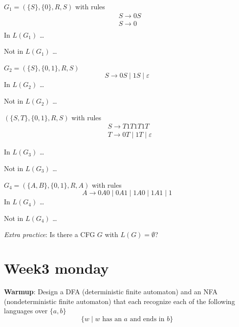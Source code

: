 \documentclass[12pt, oneside]{article}
\begin{document}
$G_1 =  (\{S\}, \{0\}, R, S)$ with rules
  \begin{align*}
    &S \to 0S\\
    &S \to 0\\
  \end{align*}
  In  $L(G_1)$ \ldots 
  
  \vspace{110pt}
  
  Not in $L(G_1)$ \ldots 

  \vspace{110pt}

\newpage
  $G_2 =  (\{S\}, \{0,1\}, R, S)$
  \[
  S \to 0S \mid 1S \mid \varepsilon
  \]
  In  $L(G_2)$ \ldots 
  
  \vspace{110pt}
  
  Not in $L(G_2)$ \ldots 

  \vspace{110pt}

  $(\{S, T\}, \{0, 1\}, R, S)$ with  rules
  \begin{align*}
  &S \to T1T1T1T \\
  &T \to  0T \mid 1T \mid \varepsilon
  \end{align*}

  In  $L(G_3)$ \ldots 
  
  \vspace{110pt}
  
  Not in $L(G_3)$ \ldots 

  \vspace{110pt}

\newpage
  $G_4 =  (\{A, B\}, \{0, 1\}, R, A)$ with rules
  \[
    A \to 0A0 \mid  0A1 \mid 1A0  \mid 1A1 \mid  1
  \]
  In  $L(G_4)$ \ldots 
  
  \vspace{110pt}
  
  Not in $L(G_4)$ \ldots 

  \vspace{110pt}

  
{\it Extra practice}: Is there a CFG $G$ with $L(G) = \emptyset$?
 \vfill
\section*{Week3 monday}


{\bf Warmup}: Design a DFA (deterministic finite automaton) and an NFA (nondeterministic
finite automaton) that each recognize each of the following languages over $\{a,b\}$
\[
    \{ w \mid \text{$w$ has an $a$ and ends in $b$}\}
\]
\end{document}

